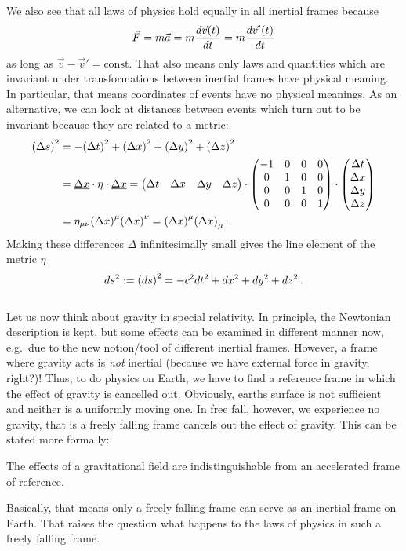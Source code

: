 We also see that all laws of physics hold equally in all inertial frames because
\begin{equation}
\vec{F} = m \vec{a} = m \dv{\vec{v}(t)}{t} = m \dv{\vec{v}'(t)}{t}
\end{equation}
as long as $\vec{v} - \vec{v}' = \text{const}$. That also means only laws and quantities which are invariant under transformations between inertial frames have physical meaning. In particular, that means coordinates of events have no physical meanings. As an alternative, we can look at distances between events which turn out to be invariant because they are related to a metric:
\begin{align*}
\qty(\Delta s)^2 &= - \qty(\Delta t)^2 + \qty(\Delta x)^2 + \qty(\Delta y)^2 + \qty(\Delta z)^2
\\
&= \underline{\Delta x} \cdot \eta \cdot \underline{\Delta x} = \mqty(\Delta t & \Delta x & \Delta y & \Delta z) \cdot \mqty(-1 & 0 & 0 & 0 \\ 0 & 1 & 0 & 0 \\ 0 & 0 & 1 & 0 \\ 0 & 0 & 0 & 1) \cdot \mqty(\Delta t \\ \Delta x \\ \Delta y \\ \Delta z)
\\
&= \eta_{\mu \nu} \qty(\Delta x)^\mu \qty(\Delta x)^\nu = \qty(\Delta x)^\mu \qty(\Delta x)_\mu \, .
\end{align*}
Making these differences $\Delta$ infinitesimally small gives the line element of the metric $\eta$
\begin{equation}
ds^2 := \qty(ds)^2 = - c^2 dt^2 + dx^2 + dy^2 + dz^2 \, .
\end{equation}\\

Let us now think about gravity in special relativity. In principle, the Newtonian description is kept, but some effects can be examined in different manner now, e.g.~due to the new notion/tool of different inertial frames. However, a frame where gravity acts is \emph{not} inertial (because we have external force in gravity, right?)! Thus, to do physics on Earth, we have to find a reference frame in which the effect of gravity is cancelled out. Obviously, earths surface is not sufficient and neither is a uniformly moving one. In free fall, however, we experience no gravity, that is a freely falling frame cancels out the effect of gravity. This can be stated more formally:
\begin{prop}
The effects of a gravitational field are indistinguishable from an accelerated frame of reference.
\end{prop}
Basically, that means only a freely falling frame can serve as an inertial frame on Earth. That raises the question what happens to the laws of physics in such a freely falling frame.

